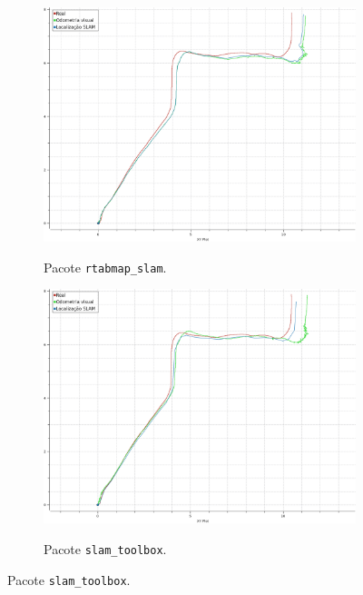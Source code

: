 \documentclass[repeatfields,xlists,xpacks,oneside,yearsonly]{ufrgscca}
\begin{document}
\begin{figure}[h]
    \caption{Estimativa de posição dos sistemas de localização}
    \label{fig:localization}
    \begin{subfigure}{0.5\linewidth}
        {
            \centering
            \caption{Pacote \texttt{rtabmap\_slam}.}
            \label{fig:localization_rtabmap}
            \includegraphics[width=0.98\linewidth]{localization-rtabmap.png}\\
        }
    \end{subfigure}
    \begin{subfigure}{0.5\linewidth}
        {
            \centering
            \caption{Pacote \texttt{slam\_toolbox}.}
            \label{fig:localization_slam_toolbox}
            \includegraphics[width=0.98\linewidth]{localization-slam-toolbox.png}\\
        }
    \end{subfigure}
\end{figure}
\end{document}
